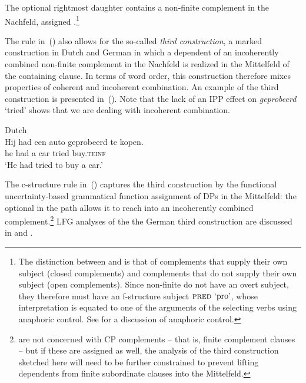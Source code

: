 \documentclass[output=paper,hidelinks]{langscibook}
\begin{document}
\begin{exe}
    \ex {} 
\end{exe}
%
The optional rightmost daughter contains a non-finite complement in the
Nachfeld, assigned \COMP{}.\footnote{The distinction between \COMP{}
and \XCOMP{} is that of complements that supply their own subject
(closed complements) and complements that do not supply their own
subject (open complements). Since non-finite  do not have an
overt subject, they therefore must have an f-structure subject $\textsc{pred}{}
\mbox{ `pro'}$, whose interpretation is equated to one of the
arguments of the selecting verbs using anaphoric control. See
\citet[Chapter 12, §3]{dalrymple01} for a discussion of anaphoric
control.}

The rule in~() also allows for the so-called \textit{third
  construction}, a marked construction in Dutch and German in which a
dependent of an incoherently combined non-finite complement in the
Nachfeld is realized in the Mittelfeld of the containing clause. In
terms of word order, this construction therefore mixes properties of
coherent and incoherent combination. An example of the third
construction is presented in~(). Note that the lack of an IPP effect on
\textit{geprobeerd} `tried' shows that we are dealing with incoherent
combination.

\begin{exe}
      \ex Dutch\\{\gll Hij had een auto geprobeerd {te kopen}.\\
      he had a car tried buy.\textsc{teinf}\\
    \glt `He had tried to buy a car.'}
\end{exe}
%
The c-structure rule in~() captures the third construction by
the functional uncertainty-based grammatical function assignment of
DPs in the Mittelfeld: the optional \COMP{} in the path allows it to
reach into an incoherently combined
complement.\footnote{\citet{KaplanZaenen2003} are not concerned with
CP complements -- that is, finite complement clauses -- but if these
are assigned \COMP as well, the analysis of the third construction
sketched here will need to be further constrained to prevent lifting
dependents from finite subordinate clauses into the Mittelfeld.} 
LFG analyses of the the German third construction are discussed in
\citet{rohrer:1996} and \citet{KaplanZaenen2003}.%
\end{document}
